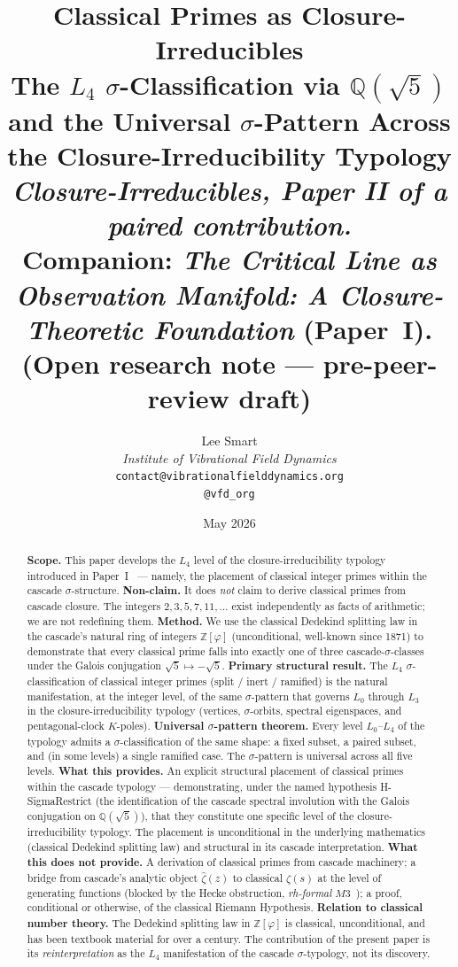 \documentclass[11pt,a4paper]{article}
\title{\textbf{Classical Primes as Closure-Irreducibles}\\[2pt]
\large The $L_4$ $\sigma$-Classification via $\mathbb{Q}(\sqrt{5})$ and the Universal $\sigma$-Pattern Across the Closure-Irreducibility Typology\\[2pt]
\normalsize \emph{Closure-Irreducibles, Paper II of a paired contribution.}\\[1pt]
\small Companion: \emph{The Critical Line as Observation Manifold: A Closure-Theoretic Foundation} (Paper~I).\\[1pt]
\small (Open research note --- pre-peer-review draft)}
\author{%
  Lee Smart\\[4pt]
  \textit{Institute of Vibrational Field Dynamics}\\[2pt]
  \texttt{contact@vibrationalfielddynamics.org}\\[2pt]
  \texttt{@vfd\_org}%
}
\date{May 2026}
\theoremstyle{definition}
\theoremstyle{remark}
\begin{document}
\maketitle
\thispagestyle{empty}

\begin{abstract}
\noindent
\textbf{Scope.} This paper develops the $L_4$ level of the closure-irreducibility
typology introduced in Paper~I~\cite{CriticalLinePaperI} --- namely, the
placement of classical integer primes within the cascade $\sigma$-structure.
\textbf{Non-claim.} It does \emph{not} claim to derive classical primes
from cascade closure. The integers $2, 3, 5, 7, 11, \ldots$ exist
independently as facts of arithmetic; we are not redefining them.
\textbf{Method.} We use the classical Dedekind splitting law in the
cascade's natural ring of integers $\mathbb{Z}[\varphi]$
(unconditional, well-known since 1871) to demonstrate that every
classical prime falls into exactly one of three cascade-$\sigma$-classes
under the Galois conjugation $\sqrt{5} \mapsto -\sqrt{5}$.
\textbf{Primary structural result.} The $L_4$ $\sigma$-classification
of classical integer primes (split / inert / ramified) is the natural
manifestation, at the integer level, of the same $\sigma$-pattern that
governs $L_0$ through $L_3$ in the closure-irreducibility typology
(vertices, $\sigma$-orbits, spectral eigenspaces, and pentagonal-clock
$K$-poles). \textbf{Universal $\sigma$-pattern theorem.} Every level
$L_0$--$L_4$ of the typology admits a $\sigma$-classification of the
same shape: a fixed subset, a paired subset, and (in some levels) a
single ramified case. The $\sigma$-pattern is universal across all
five levels.
\textbf{What this provides.} An explicit structural placement of
classical primes within the cascade typology --- demonstrating, under
the named hypothesis H-SigmaRestrict (the identification of the cascade
spectral involution with the Galois conjugation on $\mathbb{Q}(\sqrt{5})$),
that they constitute one specific level of the closure-irreducibility
typology. The placement is unconditional in the underlying mathematics
(classical Dedekind splitting law) and structural in its cascade
interpretation.
\textbf{What this does not provide.} A derivation of classical primes
from cascade machinery; a bridge from cascade's analytic object
$\hat{\zeta}(z)$ to classical $\zeta(s)$ at the level of generating
functions (blocked by the Hecke obstruction, \emph{rh-formal}
$M3$~\cite{rhFormalSmart}); a proof, conditional or otherwise, of the
classical Riemann Hypothesis.
\textbf{Relation to classical number theory.} The Dedekind splitting law
in $\mathbb{Z}[\varphi]$ is classical, unconditional, and has been
textbook material for over a century. The contribution of the present
paper is its \emph{reinterpretation} as the $L_4$ manifestation of the
cascade $\sigma$-typology, not its discovery.
\end{abstract}
\end{document}
